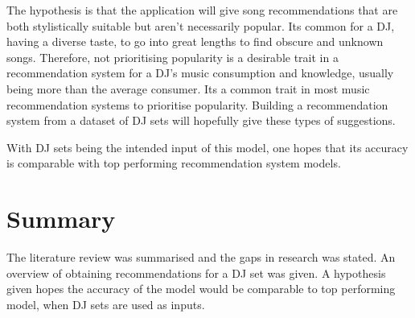 The hypothesis is that the application will give song recommendations that are both stylistically suitable but aren’t necessarily popular. Its common for a DJ, having a diverse taste, to go into
great lengths to find obscure and unknown songs. Therefore, not prioritising popularity is a
desirable trait in a recommendation system for a DJ’s music consumption and knowledge, usually
being more than the average consumer. Its a common trait in most music recommendation
systems to prioritise popularity. Building a recommendation system from a dataset of DJ sets
will hopefully give these types of suggestions.	

With DJ sets being the intended input of this model, one hopes that its accuracy is comparable with top performing recommendation system models.

\section{Summary}
The literature review was summarised and the gaps in research was stated. An overview of obtaining recommendations for a DJ set was given. A hypothesis given  hopes the accuracy of the model would be comparable to top performing model, when DJ sets are used as inputs. 



